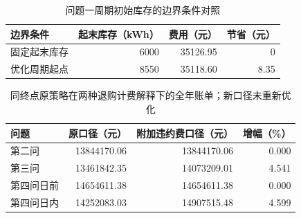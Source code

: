 \begin{table}[htbp]
\centering
\caption{问题一周期初始库存的边界条件对照}
\begin{tabular}{lrrr}
\toprule
边界条件 & 起末库存（kWh） & 费用（元） & 节省（元）\\
\midrule
固定起末库存 & 6000 & 35126.95 & 0\\
优化周期起点 & 8550 & 35118.60 & 8.35\\
\bottomrule
\end{tabular}
\end{table}

\begin{table}[htbp]
\centering
\caption{同终点原策略在两种退购计费解释下的全年账单；新口径未重新优化}
\begin{tabular}{lrrr}
\toprule
问题 & 原口径（元） & 附加违约费口径（元） & 增幅（\%）\\
\midrule
第二问 & 13844170.06 & 13844170.06 & 0.000\\
第三问 & 13461842.35 & 14073209.01 & 4.541\\
第四问日前 & 14654611.38 & 14654611.38 & 0.000\\
第四问日内 & 14252083.03 & 14907515.48 & 4.599\\
\bottomrule
\end{tabular}
\end{table}
